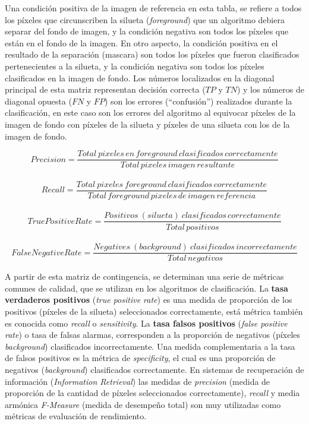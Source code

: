 Una condición positiva de la imagen de referencia en esta tabla, se refiere a todos los píxeles que circunscriben la silueta (\emph{foreground}) que un algoritmo debiera separar del fondo de imagen, y la condición negativa son todos los píxeles que están en el fondo de la imagen. En otro aspecto, la condición positiva en el resultado de la separación (mascara) son todos los píxeles que fueron clasificados pertenecientes a la silueta, y la condición negativa son todos los píxeles clasificados en la imagen de fondo. Los números localizados en la diagonal principal de esta matriz representan decisión correcta ($TP$ y $TN$) y los números de diagonal opuesta ($FN$ y $FP$) son los errores (``confusión'') realizados durante la clasificación, en este caso son los errores del algoritmo al equivocar píxeles de la imagen de fondo con píxeles de la silueta y píxeles de una silueta con los de la imagen de fondo.

\[
Precision=\frac{Total \: pixeles \, en \, foreground \, clasificados \, correctamente}{Total \, pixeles \, imagen \, resultante}
\]\\
\[
Recall=\frac{Total \: pixeles \: foreground \, clasificados \, correctamente}{Total \, foreground \, pixeles \, de \, imagen \, referencia}
\]\\
\[
True Positive Rate=\frac{Positivos  \: (silueta) \: clasificados \, correctamente}{Total \, positivos}
\]\\
\[
False Negative Rate=\frac{Negatives  \: (background) \: clasificados \, incorrectamente}{Total \, negativos}
\]

A partir de esta matriz de contingencia, se determinan una serie de métricas comunes de calidad, que se utilizan en los algoritmos de clasificación. La \textbf{tasa verdaderos positivos} (\textit{true positive rate}) es una medida de proporción de los positivos (píxeles de la silueta) seleccionados correctamente, está métrica también es conocida como \textit{recall} o \textit{sensitivity}. La \textbf{tasa falsos positivos} (\textit{false positive rate}) o tasa de falsas alarmas, corresponden a la proporción de negativos (píxeles \textit{background}) clasificados incorrectamente. Una medida complementaria a la tasa de falsos positivos es la métrica de \textit{specificity}, el cual es una proporción de negativos (\textit{background}) clasificados correctamente. En sistemas de recuperación de información (\emph{Information Retrieval}) las medidas de \emph{precision} (medida de proporción de la cantidad de píxeles seleccionados correctamente), \emph{recall} y media armónica \emph{F-Measure} \cite{brutzer_evaluation_2011} \cite{herrero_background_2009} \cite{park_benchmark_2013} (medida de desempeño total) son muy utilizadas como métricas de evaluación de rendimiento.



